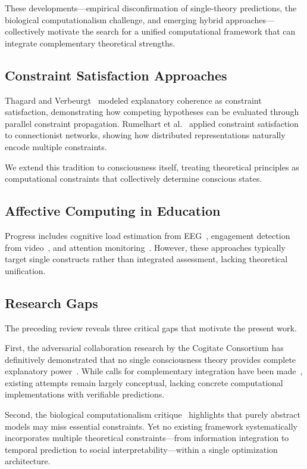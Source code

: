 \documentclass[10pt,journal,compsoc]{IEEEtran}
\begin{document}
These developments—empirical disconfirmation of single-theory predictions, the biological computationalism challenge, and emerging hybrid approaches—collectively motivate the search for a unified computational framework that can integrate complementary theoretical strengths.

\subsection{Constraint Satisfaction Approaches}

Thagard and Verbeurgt~\cite{thagard1998} modeled explanatory coherence as constraint satisfaction, demonstrating how competing hypotheses can be evaluated through parallel constraint propagation. Rumelhart et al.~\cite{rumelhart1986} applied constraint satisfaction to connectionist networks, showing how distributed representations naturally encode multiple constraints.

We extend this tradition to consciousness itself, treating theoretical principles as computational constraints that collectively determine conscious states.

\subsection{Affective Computing in Education}

Progress includes cognitive load estimation from EEG~\cite{lawhern2018,herff2014}, engagement detection from video~\cite{gupta2016}, and attention monitoring~\cite{dmello2012}. However, these approaches typically target single constructs rather than integrated assessment, lacking theoretical unification.

\subsection{Research Gaps}

The preceding review reveals three critical gaps that motivate the present work.

First, the adversarial collaboration research by the Cogitate Consortium has definitively demonstrated that no single consciousness theory provides complete explanatory power~\cite{Melloni2025}. While calls for complementary integration have been made~\cite{Storm2024}, existing attempts remain largely conceptual, lacking concrete computational implementations with verifiable predictions.

Second, the biological computationalism critique~\cite{Milinkovic2025} highlights that purely abstract models may miss essential constraints. Yet no existing framework systematically incorporates multiple theoretical constraints—from information integration to temporal prediction to social interpretability—within a single optimization architecture.
\end{document}
